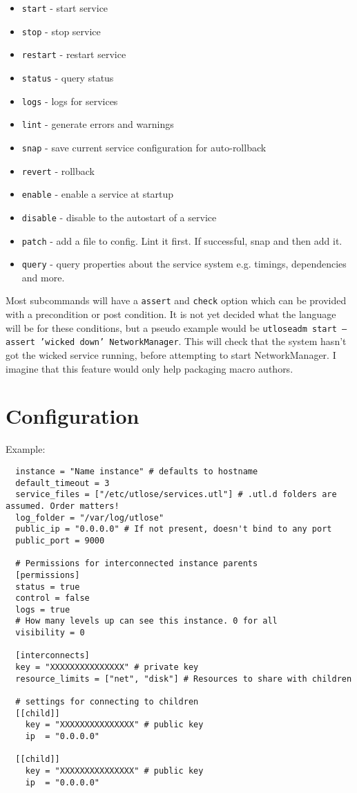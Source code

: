 \documentclass{article}
\newcommand*{\bibtitle}{Bibliography}
\begin{document}
\begin{itemize}
  \item \texttt{start} - start service
  \item \texttt{stop} - stop service
  \item \texttt{restart} - restart service
  \item \texttt{status} - query status
  \item \texttt{logs} - logs for services
  \item \texttt{lint} - generate errors and warnings
  \item \texttt{snap} - save current service configuration for auto-rollback
  \item \texttt{revert} - rollback
  \item \texttt{enable} - enable a service at startup
  \item \texttt{disable} - disable to the autostart of a service
  \item \texttt{patch} - add a file to config. Lint it first. If successful, snap and then add it.
  \item \texttt{query} - query properties about the service system e.g. timings, dependencies and more.
\end{itemize}

Most subcommands will have a \texttt{assert} and \texttt{check} option which can be provided with a
precondition or post condition. It is not yet decided what the language will be for these conditions,
but a pseudo example would be \texttt{utloseadm start --assert 'wicked down' NetworkManager}. This
will check that the system hasn't got the wicked service running, before attempting to start NetworkManager.
I imagine that this feature would only help packaging macro authors.

\section{Configuration}
Example:
\begin{verbatim}
  instance = "Name instance" # defaults to hostname
  default_timeout = 3
  service_files = ["/etc/utlose/services.utl"] # .utl.d folders are assumed. Order matters!
  log_folder = "/var/log/utlose"
  public_ip = "0.0.0.0" # If not present, doesn't bind to any port
  public_port = 9000
  
  # Permissions for interconnected instance parents
  [permissions]
  status = true
  control = false
  logs = true
  # How many levels up can see this instance. 0 for all
  visibility = 0 

  [interconnects]
  key = "XXXXXXXXXXXXXXX" # private key
  resource_limits = ["net", "disk"] # Resources to share with children

  # settings for connecting to children
  [[child]]
    key = "XXXXXXXXXXXXXXX" # public key
    ip  = "0.0.0.0"

  [[child]]
    key = "XXXXXXXXXXXXXXX" # public key
    ip  = "0.0.0.0"
\end{verbatim}



\setlength{\baselineskip}{0pt} %

{\renewcommand*\MakeUppercase[1]{#1}%
\printbibliography[heading=bibintoc,title={\bibtitle}]}
\end{document}
